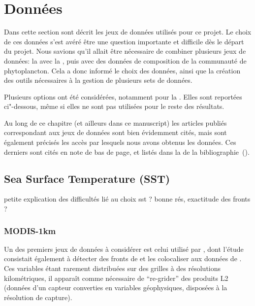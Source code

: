 
\label{chp:methodes}

\minitoc%

\section{Données}
\label{sec:donnees}

Dans cette section sont décrit les jeux de données utilisés pour ce projet.
Le choix de ces données s'est avéré être une question importante et difficile dès le départ du projet.
Nous savions qu'il allait être nécessaire de combiner plusieurs jeux de données: la  avec la , puis avec des données de composition de la communauté de phytoplancton.
Cela a donc informé le choix des données, ainsi que la création des outils nécessaires à la gestion de plusieurs sets de données.

Plusieurs options ont été considérées, notamment pour la .
Elles sont reportées ci"-dessous, même si elles ne sont pas utilisées pour le reste des résultats.

Au long de ce chapitre (et ailleurs dans ce manuscript) les articles publiés correspondant aux jeux de données sont bien évidemment cités, mais sont également précisés les accès par lesquels nous avons obtenus les données.
Ces derniers sont cités en note de bas de page, et listés dans la  de la bibliographie~().

\subsection{Sea Surface Temperature (SST)}
\label{sec:donnees-sst}

petite explication des difficultés lié au choix sst ?
bonne rés, exactitude des fronts ?

\subsubsection{MODIS-1km}

Un des premiers jeux de données  à considérer est celui utilisé par \textcite{liu_2016}, dont l'étude consistait également à détecter des fronts de  et les colocaliser aux données de .
Ces variables étant rarement distribuées sur des grilles à des résolutions kilométriques, il apparaît comme nécessaire de \enquote{re-grider} des produits L2 (données d'un capteur converties en variables géophysiques, disposées à la résolution de capture).

